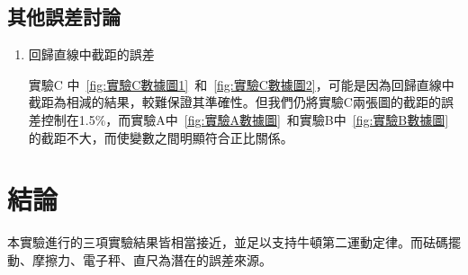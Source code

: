 \documentclass[11pt,a4paper]{article}
\theoremstyle{definition}
\begin{document}
        \subsection{其他誤差討論}

            \begin{enumerate}

                \item 回歸直線中截距的誤差
                \par
                實驗C 中\ \autoref{fig:實驗C數據圖1}\ 和\ \autoref{fig:實驗C數據圖2}，可能是因為回歸直線中截距為相減的結果，較難保證其準確性。但我們仍將實驗C兩張圖的截距的誤差控制在1.5\%，而實驗A中\ \autoref{fig:實驗A數據圖}\ 和實驗B中\ \autoref{fig:實驗B數據圖} 的截距不大，而使變數之間明顯符合正比關係。

            \end{enumerate}

    \section{結論}
        本實驗進行的三項實驗結果皆相當接近，並足以支持牛頓第二運動定律。而砝碼擺動、摩擦力、電子秤、直尺為潛在的誤差來源。
    \nocite{*}
    \printbibliography[title={參考資料}]
\end{document}
